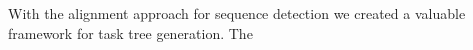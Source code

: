 With the alignment approach for sequence detection we created a valuable framework for task tree generation. 
The 



